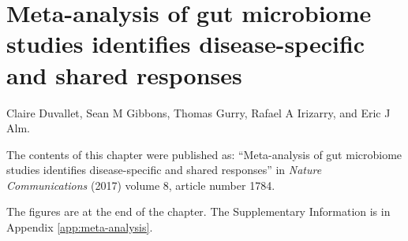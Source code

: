
\graphicspath{{meta-analysis/figures/}}

\chapter{Meta-analysis of gut microbiome studies identifies disease-specific and shared responses}\label{chap:meta-analysis}

Claire Duvallet, Sean M Gibbons, Thomas Gurry, Rafael A Irizarry, and Eric J Alm.

\bigskip
\bigskip
\noindent
The contents of this chapter were published as: ``Meta-analysis of gut microbiome studies identifies disease-specific and shared responses'' in \textit{Nature Communications} (2017) volume 8, article number 1784.

\bigskip
\bigskip
\noindent
The figures are at the end of the chapter. The Supplementary Information is in Appendix \ref{app:meta-analysis}.

\clearpage

